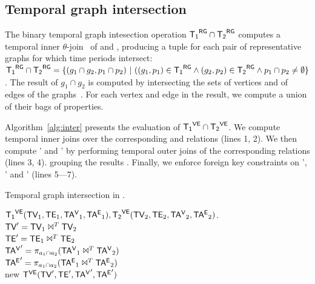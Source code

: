 \subsection{Temporal graph intersection}
\label{sec:algebra:join}

The binary temporal graph intesection operation $\mathsf{{T_1}^{RG}} \cap \mathsf{{T_2}^{RG}}$
computes a temporal inner $\theta$-join~\cite{Gao2005} of \trga and
\trgb, producing a tuple for each pair of representative graphs for
which time periods intersect: $\mathsf{{T_1}^{RG}} \cap \mathsf{{T_2}^{RG}} = \{(g_1 \cap g_2, p_1
\cap p_2)~|~((g_1, p_1) \in \mathsf{{T_1}^{RG}} \wedge (g_2, p_2) \in \mathsf{{T_2}^{RG}} \wedge
p_1 \cap p_2 \neq \emptyset \}$.  The result of $g_1 \cap g_2$ is
computed by intersecting the sets of vertices and of edges of the
graphs~\cite{GraphTheory}.  For each vertex and edge in the result, we
compute a union of their bags of properties. 


Algorithm~\ref{alg:inter} presents the evaluation of $\mathsf{{T_1}^{VE}} \cap
\mathsf{{T_2}^{VE}}$.  We compute temporal inner joins over the corresponding \tv
and \te relations (lines 1, 2).  We then compute \tav' and \tae' by
performing temporal outer joins of the corresponding relations (lines
3, 4).  grouping the results .  Finally, we enforce foreign key
constraints on \te', \tav' and \tae' (lines 5---7).

\begin{algorithm}
\caption{Temporal graph intersection in \tve.}
\begin{algorithmic}[1]
\REQUIRE $\mathsf{{T_1}^{VE}} (\textsf{TV}_1, \textsf{TE}_1, \mathsf{TA^{V}}_1, \mathsf{TA^{E}}_1), \mathsf{{T_2}^{VE}} (\textsf{TV}_2, \textsf{TE}_2, \mathsf{TA^{V}}_2, \mathsf{TA^{E}}_2)$.\\
\STATE $\textsf{TV}' = \textsf{TV}_1 \Join^T \textsf{TV}_2$\\
\STATE $\textsf{TE}' = \textsf{TE}_1 \Join^T \textsf{TE}_2$\\
\STATE $\mathsf{TA^{V}}' = \pi_{a_1 \cap a_2}(\mathsf{TA^{V}}_1 \Join^T \mathsf{TA^{V}}_2)$\\
\STATE $\mathsf{TA^{E}}' = \pi_{a_1 \cap a_2}(\mathsf{TA^{E}}_1 \Join^T \mathsf{TA^{E}}_2)$\\
\RETURN new $\mathsf{T^{VE}} (\textsf{TV}', \textsf{TE}', \mathsf{TA^{V}}', \mathsf{TA^{E}}')$\\
\end{algorithmic}
\label{alg:inter}
\end{algorithm}

